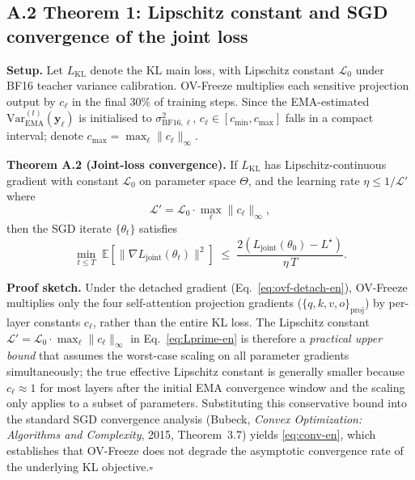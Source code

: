 \documentclass[11pt, a4paper]{article}
\begin{document}
\subsection*{A.2 Theorem 1: Lipschitz constant and SGD convergence of the joint loss}

\noindent\textbf{Setup.} Let $L_{\mathrm{KL}}$ denote the KL main loss, with Lipschitz constant $\mathcal{L}_0$ under BF16 teacher variance calibration. OV-Freeze multiplies each sensitive projection output by $c_\ell$ in the final $30\%$ of training steps. Since the EMA-estimated $\mathrm{Var}^{(t)}_{\mathrm{EMA}}(\bm{y}_\ell)$ is initialised to $\sigma^2_{\mathrm{BF16},\ell}$, $c_\ell \in [c_{\min}, c_{\max}]$ falls in a compact interval; denote $c_{\max} = \max_\ell \|c_\ell\|_\infty$.

\noindent\textbf{Theorem A.2 (Joint-loss convergence).} If $L_{\mathrm{KL}}$ has Lipschitz-continuous gradient with constant $\mathcal{L}_0$ on parameter space $\Theta$, and the learning rate $\eta \le 1/\mathcal{L}'$ where
\begin{equation}
\label{eq:Lprime-en}
\mathcal{L}' = \mathcal{L}_0\cdot\max_\ell\|c_\ell\|_\infty,
\end{equation}
then the SGD iterate $\{\theta_t\}$ satisfies
\begin{equation}
\label{eq:conv-en}
\min_{t \le T}\;\mathbb{E}\!\left[\|\nabla L_{\mathrm{joint}}(\theta_t)\|^2\right] \;\le\; \frac{2(L_{\mathrm{joint}}(\theta_0) - L^\star)}{\eta\,T}.
\end{equation}

\noindent\textbf{Proof sketch.} Under the detached gradient (Eq.~\eqref{eq:ovf-detach-en}), OV-Freeze multiplies only the four self-attention projection gradients ($\{q,k,v,o\}_{\mathrm{proj}}$) by per-layer constants $c_\ell$, rather than the entire KL loss. The Lipschitz constant $\mathcal{L}' = \mathcal{L}_0 \cdot \max_\ell\|c_\ell\|_\infty$ in Eq.~\eqref{eq:Lprime-en} is therefore a \emph{practical upper bound} that assumes the worst-case scaling on all parameter gradients simultaneously; the true effective Lipschitz constant is generally smaller because $c_\ell\approx 1$ for most layers after the initial EMA convergence window and the scaling only applies to a subset of parameters. Substituting this conservative bound into the standard SGD convergence analysis (Bubeck, \textit{Convex Optimization: Algorithms and Complexity}, 2015, Theorem~3.7) yields \eqref{eq:conv-en}, which establishes that OV-Freeze does not degrade the asymptotic convergence rate of the underlying KL objective.\hfill$\square$
\end{document}
